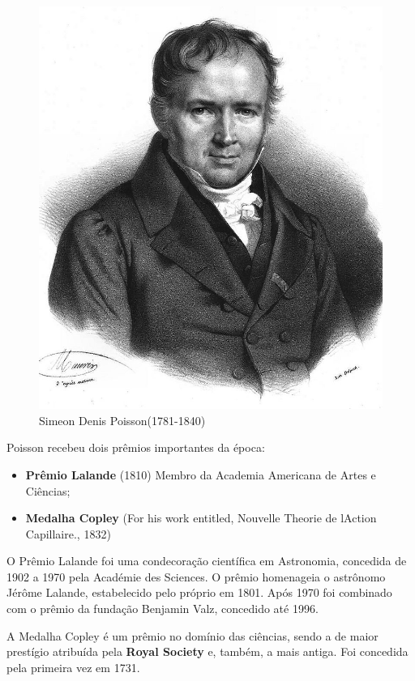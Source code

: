 \begin{figure}
    \centering
\includegraphics[scale=0.2]{figures/Simeon_Poisson.jpeg}
    \caption{Simeon Denis Poisson(1781-1840)}
    \label{fig:my_label4}
\end{figure}


Poisson recebeu dois prêmios importantes da época:

\begin{itemize}
    \item \textbf{Prêmio Lalande} (1810) Membro da Academia Americana de Artes e Ciências;
    \item \textbf{Medalha Copley} (For his work entitled, Nouvelle Theorie de lAction Capillaire., 1832)
\end{itemize}

O Prêmio Lalande foi uma condecoração científica em Astronomia, concedida de 1902 a 1970 pela Académie des Sciences. O prêmio homenageia o astrônomo Jérôme Lalande, estabelecido pelo próprio em 1801. Após 1970 foi combinado com o prêmio da fundação Benjamin Valz, concedido até 1996.\vskip0.3cm


A Medalha Copley é um prêmio no domínio das ciências, sendo
a de maior prestígio atribuída pela \textbf{Royal Society} e, também, a mais antiga. Foi concedida pela primeira vez em 1731.\vskip0.3cm


